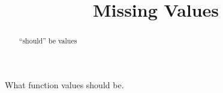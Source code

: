 \documentclass{ximera}
\title{Missing Values}
\begin{document}
\begin{abstract}
``should'' be values
\end{abstract}
\maketitle






What function values should be.
\end{document}
